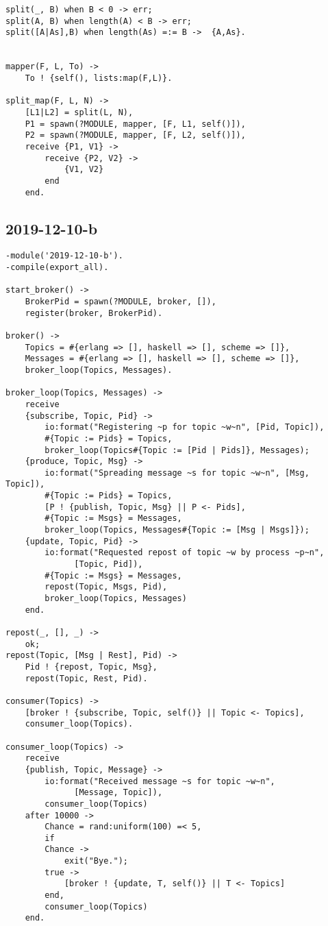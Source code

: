\begin{lstlisting}
split(_, B) when B < 0 -> err;
split(A, B) when length(A) < B -> err;
split([A|As],B) when length(As) =:= B ->  {A,As}.
    

mapper(F, L, To) ->
    To ! {self(), lists:map(F,L)}.

split_map(F, L, N) ->
    [L1|L2] = split(L, N),
    P1 = spawn(?MODULE, mapper, [F, L1, self()]),
    P2 = spawn(?MODULE, mapper, [F, L2, self()]),
    receive {P1, V1} ->
        receive {P2, V2} ->
            {V1, V2}
        end
    end.
\end{lstlisting}


\subsection{2019-12-10-b}
\begin{lstlisting}
-module('2019-12-10-b').
-compile(export_all).

start_broker() ->
    BrokerPid = spawn(?MODULE, broker, []),
    register(broker, BrokerPid).

broker() ->
    Topics = #{erlang => [], haskell => [], scheme => []},
    Messages = #{erlang => [], haskell => [], scheme => []},
    broker_loop(Topics, Messages).

broker_loop(Topics, Messages) ->
    receive
	{subscribe, Topic, Pid} ->
	    io:format("Registering ~p for topic ~w~n", [Pid, Topic]),
	    #{Topic := Pids} = Topics,
	    broker_loop(Topics#{Topic := [Pid | Pids]}, Messages);
	{produce, Topic, Msg} ->
	    io:format("Spreading message ~s for topic ~w~n", [Msg, Topic]),
	    #{Topic := Pids} = Topics,
	    [P ! {publish, Topic, Msg} || P <- Pids],
	    #{Topic := Msgs} = Messages,
	    broker_loop(Topics, Messages#{Topic := [Msg | Msgs]});
	{update, Topic, Pid} ->
	    io:format("Requested repost of topic ~w by process ~p~n",
		      [Topic, Pid]),
	    #{Topic := Msgs} = Messages,
	    repost(Topic, Msgs, Pid),
	    broker_loop(Topics, Messages)
    end.

repost(_, [], _) ->
    ok;
repost(Topic, [Msg | Rest], Pid) ->
    Pid ! {repost, Topic, Msg},
    repost(Topic, Rest, Pid).

consumer(Topics) ->
    [broker ! {subscribe, Topic, self()} || Topic <- Topics],
    consumer_loop(Topics).

consumer_loop(Topics) ->
    receive
	{publish, Topic, Message} ->
	    io:format("Received message ~s for topic ~w~n",
		      [Message, Topic]),
	    consumer_loop(Topics)
    after 10000 ->
	    Chance = rand:uniform(100) =< 5,
	    if
		Chance ->
		    exit("Bye.");
		true ->
		    [broker ! {update, T, self()} || T <- Topics]
	    end,
	    consumer_loop(Topics)
    end.


\end{lstlisting}
